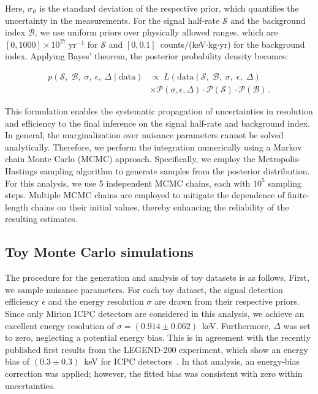 Here, $\sigma_\vartheta$ is the standard deviation of the respective prior, which quantifies the uncertainty in the measurements. For the signal half-rate $\mathcal{S}$ and the background index $\mathcal{B}$, we use uniform priors over physically allowed ranges, which are $[0, 1000] \times 10^{27} \; \mathrm{yr}^{-1}$ for $\mathcal{S}$ and $[0, 0.1]$~counts/(keV$\cdot$kg$\cdot$yr) for the background index. 
Applying Bayes' theorem, the posterior probability density becomes: 


\begin{align}
	p\left( \mathcal{S}, \; \mathcal{B}, \; \sigma, \: \epsilon, \; \Delta \mid \mathrm{data} \right) & \propto \; 
	L \left( \mathrm{data} \mid \mathcal{S}, \; \mathcal{B}, \; \sigma, \; \epsilon, \; \Delta \right) \\ & \times  \mathcal{P}(\sigma, \epsilon, \Delta) \cdot \mathcal{P}(\mathcal{S}) \cdot  \mathcal{P}(\mathcal{B})  \nonumber \,.
\end{align}

This formulation enables the systematic propagation of uncertainties in resolution and efficiency to the final inference on the signal half-rate and background index. In general, the marginalization over nuisance parameters cannot be solved analytically. Therefore, we perform the integration numerically using a Markov chain Monte Carlo (MCMC) approach. Specifically, we employ the Metropolis-Hastings sampling algorithm to generate samples from the posterior distribution. For this analysis, we use 5 independent MCMC chains, each with $10^{5}$ sampling steps. Multiple MCMC chains are employed to mitigate the dependence of finite-length chains on their initial values, thereby enhancing the reliability of the resulting estimates.


\subsection{Toy Monte Carlo simulations}

The procedure for the generation and analysis of toy datasets is as follows. 
First, we sample nuisance parameters. For each toy dataset, the signal detection efficiency $\epsilon$ and the energy resolution $\sigma$ are drawn from their respective priors. Since only Mirion ICPC detectors are considered in this analysis, we achieve an excellent energy resolution of $\sigma = (0.914 \pm 0.062)$~keV. Furthermore, $\Delta$ was set to zero, neglecting a potential energy bias. This is in agreement with the recently published first results from the LEGEND-200 experiment, which show an energy bias of $(0.3 \pm 0.3)$~keV for ICPC detectors~\cite{legend200_fist_results_2025}. In that analysis, an energy-bias correction was applied; however, the fitted bias was consistent with zero within uncertainties.

